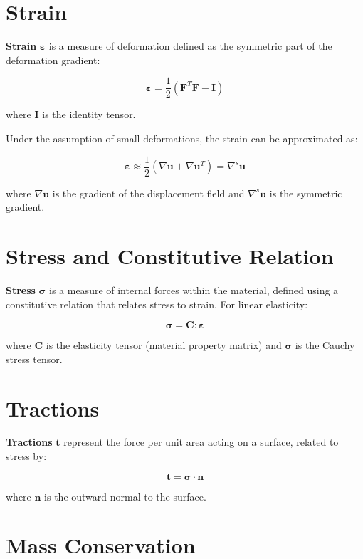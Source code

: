 \documentclass[
  11pt,
  a4paper,
]{scrbook}
\begin{document}
\section{Strain}\label{strain}

\textbf{Strain} \(\boldsymbol{\varepsilon}\) is a measure of deformation
defined as the symmetric part of the deformation gradient:

\[\boldsymbol{\varepsilon} = \frac{1}{2}(\mathbf{F}^T \mathbf{F} - \mathbf{I})\]

where \(\mathbf{I}\) is the identity tensor.

Under the assumption of small deformations, the strain can be
approximated as:

\[\boldsymbol{\varepsilon} \approx \frac{1}{2}(\nabla \mathbf{u} + \nabla \mathbf{u}^T) = \nabla^s\mathbf{u}\]

where \(\nabla \mathbf{u}\) is the gradient of the displacement field
and \(\nabla^s\mathbf{u}\) is the symmetric gradient.

\section{Stress and Constitutive
Relation}\label{stress-and-constitutive-relation}

\textbf{Stress} \(\boldsymbol{\sigma}\) is a measure of internal forces
within the material, defined using a constitutive relation that relates
stress to strain. For linear elasticity:

\[\boldsymbol{\sigma} = \mathbf{C} : \boldsymbol{\varepsilon}\]

where \(\mathbf{C}\) is the elasticity tensor (material property matrix)
and \(\boldsymbol{\sigma}\) is the Cauchy stress tensor.

\section{Tractions}\label{tractions}

\textbf{Tractions} \(\mathbf{t}\) represent the force per unit area
acting on a surface, related to stress by:

\[\mathbf{t} = \boldsymbol{\sigma} \cdot \mathbf{n}\]

where \(\mathbf{n}\) is the outward normal to the surface.

\section{Mass Conservation}\label{mass-conservation}
\end{document}
